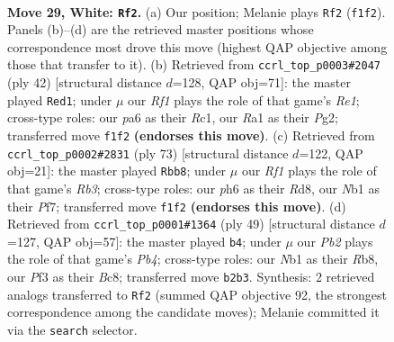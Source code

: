 \documentclass[11pt]{article}
\begin{document}
\clearpage

\begin{figure}[p]\centering
\begin{subfigure}{0.46\textwidth}\centering
\resizebox{\linewidth}{!}{%
\newchessgame
\chessboard[
  setfen={nr1r2k1/5pb1/p5qp/2Q1p3/1p2P2n/3P1P1b/PP1B2B1/RN2NRK1 w - - 1 29},
  showmover=false,
  pgfstyle=straightmove, color=movearrow, markmove={f1-f2}
]}
\caption{}
\end{subfigure}\hfill
\begin{subfigure}{0.46\textwidth}\centering
\resizebox{\linewidth}{!}{%
\newchessgame
\chessboard[
  setfen={2r1rbk1/1q1n1ppp/1p6/1N1p1Q2/3Nn3/pPP1B3/P4PPP/2R1R1K1 w - - 3 22},
  showmover=false,
  pgfstyle=straightmove, color=movearrow, markmove={e1-d1}
]}
\caption{}
\end{subfigure}
\\[4pt]
\begin{subfigure}{0.46\textwidth}\centering
\resizebox{\linewidth}{!}{%
\newchessgame
\chessboard[
  setfen={3rb1k1/q4pp1/1rnb3p/1p2p3/4B3/P3PNPP/1Q3P2/R2RB1K1 b - - 4 37},
  showmover=false,
  pgfstyle=straightmove, color=movearrow, markmove={b6-b8}
]}
\caption{}
\end{subfigure}\hfill
\begin{subfigure}{0.46\textwidth}\centering
\resizebox{\linewidth}{!}{%
\newchessgame
\chessboard[
  setfen={1rb2r1k/p3b1p1/2q1p1Bp/1p1n2NQ/3p1P2/P7/1PP1N1PP/R4R1K b - - 1 25},
  showmover=false,
  pgfstyle=straightmove, color=movearrow, markmove={b5-b4}
]}
\caption{}
\end{subfigure}
\caption{\textbf{Move 29, White: \texttt{Rf2}.} (a) Our position; Melanie plays \texttt{Rf2} (\texttt{f1f2}). Panels (b)--(d) are the retrieved master positions whose correspondence most drove this move (highest QAP objective among those that transfer to it). (b) Retrieved from \texttt{ccrl\_top\_p0003\#2047} (ply 42) [structural distance $d$=128, QAP obj=71]: the master played \texttt{Red1}; under $\mu$ our \emph{Rf1} plays the role of that game's \emph{Re1}; cross-type roles: our \emph{p}a6 as their \emph{R}c1, our \emph{R}a1 as their \emph{P}g2; transferred move \texttt{f1f2} \textbf{(endorses this move)}. (c) Retrieved from \texttt{ccrl\_top\_p0002\#2831} (ply 73) [structural distance $d$=122, QAP obj=21]: the master played \texttt{Rbb8}; under $\mu$ our \emph{Rf1} plays the role of that game's \emph{Rb3}; cross-type roles: our \emph{p}h6 as their \emph{R}d8, our \emph{N}b1 as their \emph{P}f7; transferred move \texttt{f1f2} \textbf{(endorses this move)}. (d) Retrieved from \texttt{ccrl\_top\_p0001\#1364} (ply 49) [structural distance $d$=127, QAP obj=57]: the master played \texttt{b4}; under $\mu$ our \emph{Pb2} plays the role of that game's \emph{Pb4}; cross-type roles: our \emph{N}b1 as their \emph{R}b8, our \emph{P}f3 as their \emph{B}c8; transferred move \texttt{b2b3}. Synthesis: 2 retrieved analogs transferred to \texttt{Rf2} (summed QAP objective 92, the strongest correspondence among the candidate moves); Melanie committed it via the \texttt{search} selector.}
\label{fig:thought-m56}
\end{figure}
\end{document}
